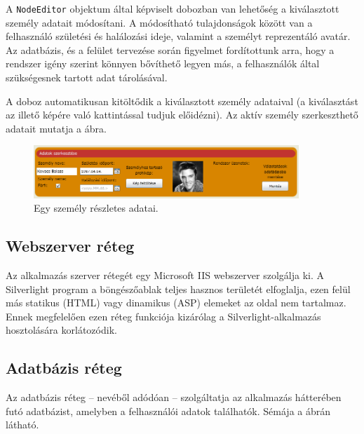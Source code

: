 \bigskip

A \texttt{NodeEditor} objektum által képviselt dobozban van lehetőség a kiválasztott személy adatait módosítani. A módosítható tulajdonságok között van a felhasználó születési és halálozási ideje, valamint a személyt reprezentáló avatár. Az adatbázis, és a felület tervezése során figyelmet fordítottunk arra, hogy a rendszer igény szerint könnyen bővíthető legyen más, a felhasználók által szükségesnek tartott adat tárolásával.

A doboz automatikusan kitöltődik a kiválasztott személy adataival (a kiválasztást az illető képére való kattintással tudjuk előidézni). Az aktív személy szerkeszthető adatait mutatja a  ábra.

\begin{figure}[!ht]
\centering
\includegraphics[width=100mm, keepaspectratio]{figures/reszletek.png}
\caption{Egy személy részletes adatai.}
\label{fig:alk_edit}
\end{figure}

\subsection{Webszerver réteg}\label{sect:szerver_reteg}

Az alkalmazás szerver rétegét egy Microsoft IIS webszerver szolgálja ki. A Silverlight program a böngészőablak teljes hasznos területét elfoglalja, ezen felül más statikus (HTML) vagy dinamikus (ASP) elemeket az oldal nem tartalmaz. Ennek megfelelően ezen réteg funkciója kizárólag a Silverlight-alkalmazás hosztolására korlátozódik.

\subsection{Adatbázis réteg}\label{sect:adatbazis_reteg}

Az adatbázis réteg -- nevéből adódóan -- szolgáltatja az alkalmazás hátterében futó adatbázist, amelyben a felhasználói adatok találhatók. Sémája a  ábrán látható.

